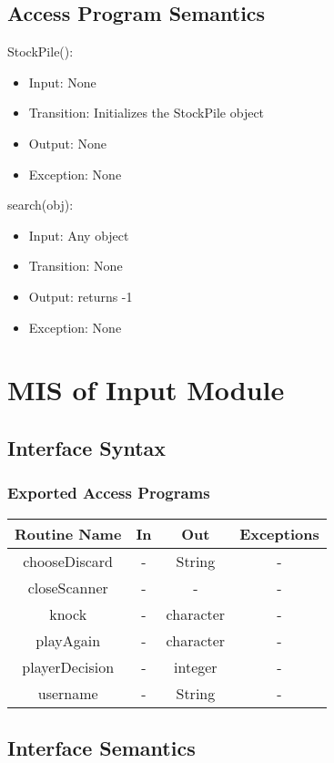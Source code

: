 \documentclass[12pt, titlepage]{article}
\begin{document}
\subsection{Access Program Semantics}
StockPile():
\begin{itemize}
    \item Input: None 
    \item Transition: Initializes the StockPile object
    \item Output: None
    \item Exception: None
\end{itemize}
\noindent search(obj):
\begin{itemize}
    \item Input: Any object
    \item Transition: None
    \item Output: returns -1
    \item Exception: None
\end{itemize}

\section{MIS of Input Module}

\subsection{Interface Syntax}
\subsubsection{Exported Access Programs}
\begin{tabular}{|c|c|c|c|}
    \hline
    \textbf{Routine Name} & \textbf{In} & \textbf{Out} & \textbf{Exceptions} \\
    \hline
    chooseDiscard & - & String & - \\
    \hline
    closeScanner & - & - & - \\
    \hline
    knock & - & character & - \\
    \hline
    playAgain & - & character & - \\
    \hline
    playerDecision & - & integer & - \\
    \hline
    username & - & String & - \\
    \hline
\end{tabular}

\subsection{Interface Semantics}
\end{document}
